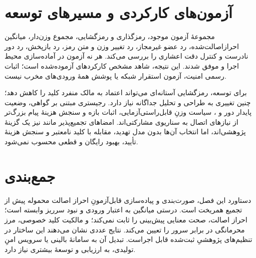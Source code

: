 \section{آزمون‌های کارکردی و مسیرهای توسعه}
مجموعۀ آزمون موجود، رمزگذاری و رمزگشایی، مجموع وزن‌دار، میانگین احرازاصالت‌شده، رد عضو غیرمجاز، رد تغییر وزن و متن رمز، رد بازپخش، رد دور نادرست و کنترل دقت اعشاری را بررسی می‌کند. هر نه آزمون در آماده‌سازی محیط اجرا و موفق شدند. این نتیجه، شاهد مشخص کارکردهای آزموده‌شده است؛ اثبات رسمی امنیت، آزمون استقرار شبکه یا پوشش همۀ ورودی‌های مخرب نیست.

برای توسعه، رمزگشایی آستانه‌ای می‌تواند اعتماد به مالک منفرد کلید را کاهش دهد؛ چنین تغییری به طراحی و تحلیل جداگانه نیاز دارد. رجیستری مبتنی بر گواهی، وضعیت پایدار دور و ، سیاست وزنِ قابل‌راستی‌آزمایی، اثبات بازه و سنجش هزینۀ پیام بزرگ‌تر از نیازهای اتصال به سناریوی مشارکتی‌اند. امضاهای تجمیع‌پذیر مانند  نیز یک گزینۀ پژوهشی‌اند، اما انتخاب آن‌ها بدون مدل تهدید، مقابله با کلید نامعتبر و سنجش هزینۀ تأیید، بهبود رایگان و قطعی محسوب نمی‌شود.

\section{جمع‌بندی}
دستاورد این فصل، صورت‌بندی و پیاده‌سازی قابل‌آزمونِ احراز اصالت محموله پیش از تجمیع همریخت است. درستی میانگین به اعتبار ورودی و نبود سرریز وابسته است؛ احراز اصالت، صحت معنایی پیش‌بینی را ثابت نمی‌کند؛ و مالکیت کلید خصوصی، مرز محرمانگی در برابر سرور را تعیین می‌کند. نتایج عددی نشان می‌دهند این ساختار در تنظیم‌های پژوهشیِ ثبت‌شده قابل اجراست. تبدیل آن به سامانۀ بالینی یا سرویس امنِ تولیدی، به ارزیابی و توسعۀ بیشتری نیاز دارد.
\FloatBarrier
